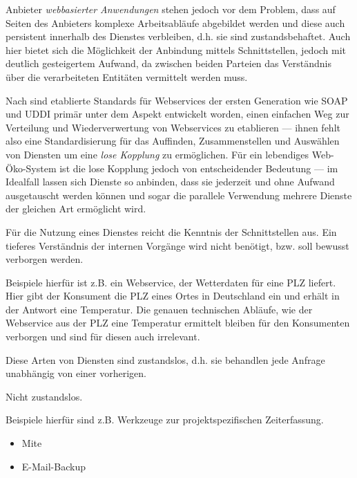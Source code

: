 \documentclass[10pt,a4paper]{article}
\begin{document}

Anbieter \emph{webbasierter Anwendungen} stehen jedoch vor dem Problem, dass auf Seiten des Anbieters 
komplexe Arbeitsabläufe abgebildet werden und diese auch persistent innerhalb des Dienstes verbleiben, 
d.h. sie sind zustandsbehaftet. Auch hier bietet sich die Möglichkeit der Anbindung mittels Schnittstellen, 
jedoch mit deutlich gesteigertem Aufwand, da zwischen beiden Parteien das Verständnis über die verarbeiteten 
Entitäten vermittelt werden muss. 

Nach \cite[Seite 653]{ei-sawsdl} sind etablierte Standards für Webservices der ersten Generation wie \ac{SOAP} und \ac{UDDI} primär unter dem Aspekt entwickelt worden, einen einfachen Weg zur Verteilung und Wiederverwertung von Webservices zu etablieren --- ihnen fehlt also eine Standardisierung für das Auffinden, Zusammenstellen und Auswählen von Diensten um eine \emph{lose Kopplung} zu ermöglichen. Für ein lebendiges Web-Öko-System ist die lose Kopplung jedoch von entscheidender Bedeutung --- im Idealfall lassen sich Dienste so anbinden, dass sie jederzeit und ohne Aufwand ausgetauscht werden können und sogar die parallele Verwendung mehrere Dienste der gleichen Art ermöglicht wird.


Für die Nutzung eines Dienstes reicht die Kenntnis der Schnittstellen aus. Ein tieferes Verständnis
der internen Vorgänge wird nicht benötigt, bzw. soll bewusst verborgen werden. \cite{hhxmlwssoa}

Beispiele hierfür ist z.B. ein Webservice, der Wetterdaten für eine PLZ liefert. Hier gibt der Konsument die PLZ eines Ortes in Deutschland ein und erhält in der Antwort eine Temperatur. Die genauen technischen Abläufe, wie der Webservice aus der PLZ eine Temperatur ermittelt bleiben für den Konsumenten verborgen und sind für diesen auch irrelevant.

Diese Arten von Diensten sind zustandslos, d.h. sie behandlen jede Anfrage unabhängig von einer vorherigen.


Nicht zustandslos.

Beispiele hierfür sind z.B. Werkzeuge zur projektspezifischen Zeiterfassung. 


\begin{itemize}
\item Mite
\item E-Mail-Backup
\end{itemize}
\end{document}
